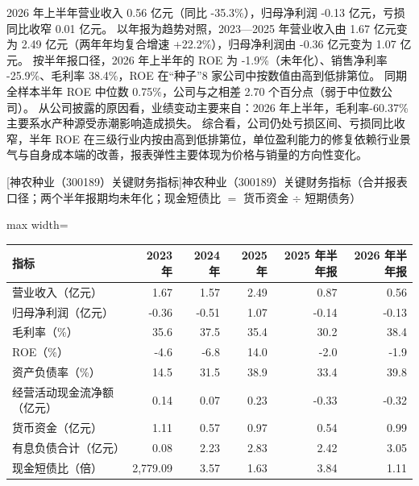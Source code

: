  2026 年上半年营业收入 0.56 亿元（同比 -35.3\%），归母净利润 -0.13 亿元，亏损同比收窄 0.01 亿元。 以年报为趋势对照，2023---2025 年营业收入由 1.67 亿元变为 2.49 亿元（两年年均复合增速 +22.2\%），归母净利润由 -0.36 亿元变为 1.07 亿元。 按半年报口径，2026 年上半年的 ROE 为 -1.9\%（未年化）、销售净利率 -25.9\%、毛利率 38.4\%，ROE 在“种子”8 家公司中按数值由高到低排第位。 同期全样本半年 ROE 中位数 0.75\%，公司与之相差 2.70 个百分点（弱于中位数公司）。 从公司披露的原因看，业绩变动主要来自：2026 年上半年，毛利率-60.37\% 主要系水产种源受赤潮影响造成损失。 综合看，公司仍处亏损区间、亏损同比收窄，半年 ROE 在三级行业内按由高到低排第位，单位盈利能力的修复依赖行业景气与自身成本端的改善，报表弹性主要体现为价格与销量的方向性变化。

\begin{center}\small\setlength{\tabcolsep}{3.4pt}
[神农种业（300189）关键财务指标]{神农种业（300189）关键财务指标（合并报表口径；两个半年报期均未年化；现金短债比 $=$ 货币资金 $\div$ 短期债务）}
\begin{adjustbox}{max width=\textwidth}
\begin{tabular}{@{}lrrrrr@{}}
\toprule
指标 & 2023 年 & 2024 年 & 2025 年 & 2025 年半年报 & 2026 年半年报 \\
\midrule
营业收入（亿元） & 1.67 & 1.57 & 2.49 & 0.87 & 0.56 \\
归母净利润（亿元） & -0.36 & -0.51 & 1.07 & -0.14 & -0.13 \\
毛利率（\%） & 35.6 & 37.5 & 35.4 & 30.2 & 38.4 \\
ROE（\%） & -4.6 & -6.8 & 14.0 & -2.0 & -1.9 \\
资产负债率（\%） & 14.5 & 31.5 & 38.9 & 33.4 & 39.8 \\
经营活动现金流净额（亿元） & 0.14 & 0.07 & 0.23 & -0.33 & -0.32 \\
货币资金（亿元） & 1.11 & 0.57 & 0.97 & 0.54 & 0.99 \\
有息负债合计（亿元） & 0.08 & 2.23 & 2.83 & 2.42 & 3.05 \\
现金短债比（倍） & 2,779.09 & 3.57 & 1.63 & 3.84 & 1.11 \\
\bottomrule
\end{tabular}
\end{adjustbox}
\end{center}

